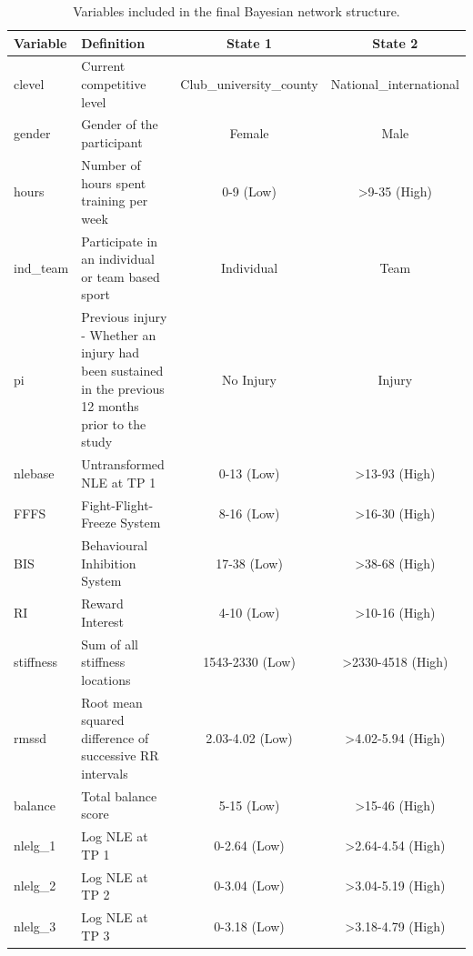 \documentclass[
  english,
  man,floatsintext]{apa6}
\begin{document}
\begin{table}[H]

\caption{\label{tab:finalvars}Variables included in the final Bayesian network structure.}
\centering
\begin{tabular}[t]{l>{\raggedright\arraybackslash}p{5.2cm}cc}
\toprule
Variable & Definition & State 1 & State 2\\
\midrule
clevel & Current competitive level & Club\_university\_county & National\_international\\
gender & Gender of the participant & Female & Male\\
hours & Number of hours spent training per week & 0-9 (Low) & >9-35 (High)\\
ind\_team & Participate in an individual or team based sport & Individual & Team\\
pi & Previous injury - Whether an injury had been sustained in the previous 12 months prior to the study & No Injury & Injury\\
\addlinespace
nlebase & Untransformed NLE at TP 1 & 0-13 (Low) & >13-93 (High)\\
FFFS & Fight-Flight-Freeze System & 8-16 (Low) & >16-30 (High)\\
BIS & Behavioural Inhibition System & 17-38 (Low) & >38-68 (High)\\
RI & Reward Interest & 4-10 (Low) & >10-16 (High)\\
stiffness & Sum of all stiffness locations & 1543-2330 (Low) & >2330-4518 (High)\\
\addlinespace
rmssd & Root mean squared difference of successive RR intervals & 2.03-4.02 (Low) & >4.02-5.94 (High)\\
balance & Total balance score & 5-15 (Low) & >15-46 (High)\\
nlelg\_1 & Log NLE at TP 1 & 0-2.64 (Low) & >2.64-4.54 (High)\\
nlelg\_2 & Log NLE at TP 2 & 0-3.04 (Low) & >3.04-5.19 (High)\\
nlelg\_3 & Log NLE at TP 3 & 0-3.18 (Low) & >3.18-4.79 (High)\\
\bottomrule
\end{tabular}
\end{table}
\end{document}
